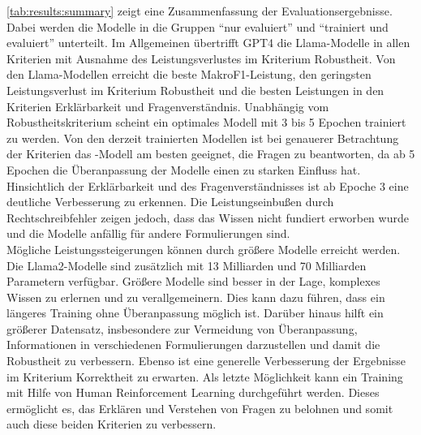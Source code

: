     \cref{tab:results:summary} zeigt eine Zusammenfassung der Evaluationsergebnisse.
    Dabei werden die Modelle in die Gruppen \enquote{nur evaluiert} und \enquote{trainiert und evaluiert} unterteilt.
    Im Allgemeinen übertrifft GPT4 die Llama-Modelle in allen Kriterien mit Ausnahme des Leistungsverlustes im Kriterium Robustheit.
    Von den Llama-Modellen erreicht \lsa{} die beste MakroF1-Leistung, \lioa{} den geringsten Leistungsverlust im Kriterium Robustheit und \lea{} die besten Leistungen in den Kriterien Erklärbarkeit und Fragenverständnis.
    Unabhängig vom Robustheitskriterium scheint ein optimales Modell mit 3 bis 5 Epochen trainiert zu werden.
    Von den derzeit trainierten Modellen ist bei genauerer Betrachtung der Kriterien das \lea-Modell am besten geeignet, die Fragen zu beantworten, da ab 5 Epochen die Überanpassung der Modelle einen zu starken Einfluss hat.\\
    
    Hinsichtlich der Erklärbarkeit und des Fragenverständnisses ist ab Epoche 3 eine deutliche Verbesserung zu erkennen.
    Die Leistungseinbußen durch Rechtschreibfehler zeigen jedoch, dass das Wissen nicht fundiert erworben wurde und die Modelle anfällig für andere Formulierungen sind.\\
    
    Mögliche Leistungssteigerungen können durch größere Modelle erreicht werden.
    Die Llama2-Modelle sind zusätzlich mit 13 Milliarden und 70 Milliarden Parametern verfügbar.
    Größere Modelle sind besser in der Lage, komplexes Wissen zu erlernen und zu verallgemeinern.
    Dies kann dazu führen, dass ein längeres Training ohne Überanpassung möglich ist.
    Darüber hinaus hilft ein größerer Datensatz, insbesondere zur Vermeidung von Überanpassung, Informationen in verschiedenen Formulierungen darzustellen und damit die Robustheit zu verbessern.
    Ebenso ist eine generelle Verbesserung der Ergebnisse im Kriterium Korrektheit zu erwarten.
    Als letzte Möglichkeit kann ein Training mit Hilfe von Human Reinforcement Learning durchgeführt werden.
    Dieses ermöglicht es, das Erklären und Verstehen von Fragen zu belohnen und somit auch diese beiden Kriterien zu verbessern.